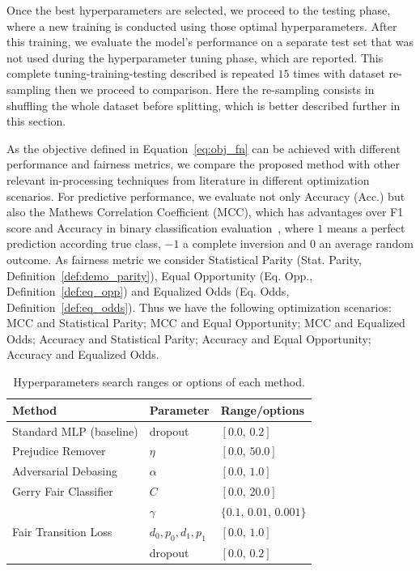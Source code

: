 Once the best hyperparameters are selected, we proceed to the testing phase, where a new training is conducted using those optimal hyperparameters. After this training, we evaluate the model's performance on a separate test set that was not used during the hyperparameter tuning phase, which are reported. This complete tuning-training-testing described is repeated $15$ times with dataset re-sampling then we proceed to comparison. Here the re-sampling consists in shuffling the whole dataset before splitting, which is better described further in this section.

As the objective defined in Equation~\ref{eq:obj_fn} can be achieved with different performance and fairness metrics, we compare the proposed method with other relevant in-processing techniques from literature in different optimization scenarios. For predictive performance, we evaluate not only Accuracy (Acc.) but also the Mathews Correlation Coefficient (MCC), which has advantages over F1 score and Accuracy in binary classification evaluation~\citep{chicco2020advantages}, where $1$ means a perfect prediction according true class, $-1$ a complete inversion and $0$ an average random outcome. As fairness metric we consider Statistical Parity (Stat. Parity, Definition~\ref{def:demo_parity}), Equal Opportunity (Eq. Opp., Definition~\ref{def:eq_opp}) and Equalized Odds (Eq. Odds, Definition~\ref{def:eq_odds}). Thus we have the following optimization scenarios: MCC and Statistical Parity; MCC and Equal Opportunity; MCC and Equalized Odds; Accuracy and Statistical Parity; Accuracy and Equal Opportunity; Accuracy and Equalized Odds.

\begin{table}[ht]
\centering
\caption{Hyperparameters search ranges or options of each method.}\label{tab:hyperparameters}
{\footnotesize
\begin{tabular}{lll}
\toprule
Method & Parameter & Range/options \\ \midrule 
 Standard MLP (baseline) & dropout & $[0.0,\,0.2]$  \vspace{1ex} \\ 
 Prejudice Remover~\citep{Kamishima2012} & $\eta$ & $[0.0,\,50.0]$ \vspace{1ex} \\  
 Adversarial Debasing~\citep{Zhang2018}& $\alpha$ & $[0.0,\,1.0]$  \vspace{1ex} \\ 
 Gerry Fair Classifier~\citep{pmlr-v80-kearns18a} & $C$ & $[0.0,\,20.0]$ \\ 
 &  $\gamma$ & $\{0.1,\,0.01,\,0.001\}$ \vspace{1ex} \\  
 Fair Transition Loss & $d_0,p_0,d_1,p_1$ & $[0.0,\,1.0]$ \\ 
 &  dropout & $[0.0,\,0.2]$ \\ 
\bottomrule
\end{tabular}
}
\end{table}

